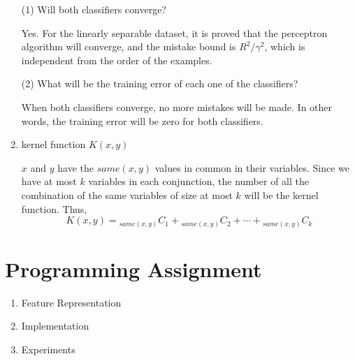 \begin{enumerate}
(1) Will both classifiers converge?

Yes. For the linearly separable dataset, it is proved that the perceptron algorithm will converge, and the mistake bound is $R^2/\gamma^2$, which is independent from the order of the examples.

(2) What will be the training error of each one of the classifiers?

When both classifiers converge, no more mistakes will be made. In other words, the training error will be zero for both classifiers.

\item kernel function $K(x, y)$

$x$ and $y$ have the $same(x,y)$ values in common in their variables. Since we have at most $k$ variables in each conjunction, the number of all the combination of the same variables of size at most $k$ will be the kernel function. Thus,
\[
K(x, y)={}_{same(x,y)} C _1 + {}_{same(x,y)} C _2 + \cdots + {}_{same(x,y)} C _k
\]

\end{enumerate}

\section{Programming Assignment}
\begin{enumerate}
\item Feature Representation

\item Implementation


\item Experiments


\end{enumerate}




